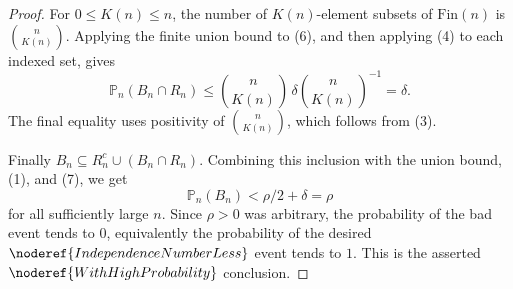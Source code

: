 \begin{proof}
For \(0\le K(n)\le n\), the number of \(K(n)\)-element subsets of
\(\mathrm{Fin}(n)\) is \(\binom n{K(n)}\).  Applying the finite union bound to
(6), and then applying (4) to each indexed set, gives
\[
\mathbb P_n(B_n\cap R_n)
\le
\binom n{K(n)}\,
\delta\binom n{K(n)}^{-1}
=\delta. \tag{7}
\]
The final equality uses positivity of \(\binom n{K(n)}\), which follows from
(3).

Finally \(B_n\subseteq R_n^c\cup(B_n\cap R_n)\).  Combining this inclusion
with the union bound, (1), and (7), we get
\[
\mathbb P_n(B_n)<\rho/2+\delta=\rho
\]
for all sufficiently large \(n\).  Since \(\rho>0\) was arbitrary, the
probability of the bad event tends to \(0\), equivalently the probability of
the desired \(\noderef{IndependenceNumberLess}\) event tends to \(1\).  This
is the asserted \(\noderef{WithHighProbability}\) conclusion.
\end{proof}
